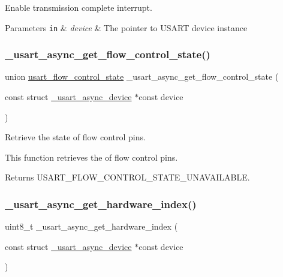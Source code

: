 Enable transmission complete interrupt. 


\begin{DoxyParams}[1]{Parameters}
\mbox{\tt in}  & {\em device} & The pointer to U\+S\+A\+RT device instance \\
\hline
\end{DoxyParams}
\mbox{\label{group___h_p_l_gaa9850f9d97cb87f80fa615e95330ce35}} 
\subsubsection{\texorpdfstring{\+\_\+usart\+\_\+async\+\_\+get\+\_\+flow\+\_\+control\+\_\+state()}{\_usart\_async\_get\_flow\_control\_state()}}
{\footnotesize\ttfamily union \hyperlink{unionusart__flow__control__state}{usart\+\_\+flow\+\_\+control\+\_\+state} \+\_\+usart\+\_\+async\+\_\+get\+\_\+flow\+\_\+control\+\_\+state (\begin{DoxyParamCaption}\item[{const struct \hyperlink{struct__usart__async__device}{\+\_\+usart\+\_\+async\+\_\+device} $\ast$const}]{device }\end{DoxyParamCaption})}



Retrieve the state of flow control pins. 

This function retrieves the of flow control pins.

\begin{DoxyReturn}{Returns}
U\+S\+A\+R\+T\+\_\+\+F\+L\+O\+W\+\_\+\+C\+O\+N\+T\+R\+O\+L\+\_\+\+S\+T\+A\+T\+E\+\_\+\+U\+N\+A\+V\+A\+I\+L\+A\+B\+LE. 
\end{DoxyReturn}
\mbox{\label{group___h_p_l_ga378f2b4e0a90e5f5e354da00b3e6e531}} 
\subsubsection{\texorpdfstring{\+\_\+usart\+\_\+async\+\_\+get\+\_\+hardware\+\_\+index()}{\_usart\_async\_get\_hardware\_index()}}
{\footnotesize\ttfamily uint8\+\_\+t \+\_\+usart\+\_\+async\+\_\+get\+\_\+hardware\+\_\+index (\begin{DoxyParamCaption}\item[{const struct \hyperlink{struct__usart__async__device}{\+\_\+usart\+\_\+async\+\_\+device} $\ast$const}]{device }\end{DoxyParamCaption})}



